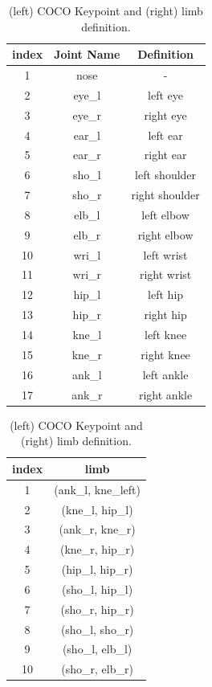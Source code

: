 \begin{table}[htpb]
	\caption[COCO keypoints and limb definition]{(left) COCO Keypoint and (right) limb definition.}\label{ch5:coco-definition}
	\centering
	\begin{tabular}{|c|c|c|}
		\toprule
		index & Joint Name & Definition\\
		\midrule
		1 & nose & - \\ \hline
		2 & eye\_l & left eye \\ \hline
		3 & eye\_r & right eye \\ \hline
		4 & ear\_l & left ear \\ \hline
		5 & ear\_r & right ear \\ \hline
		6 & sho\_l & left shoulder \\ \hline
		7 & sho\_r & right shoulder \\ \hline
		8 & elb\_l & left elbow \\ \hline
		9 & elb\_r & right elbow \\ \hline
		10 & wri\_l & left wrist \\ \hline
		11	 & wri\_r & right wrist \\ \hline
		12 & hip\_l & left hip \\ \hline
		13 & hip\_r & right hip \\ \hline
		14 & kne\_l & left knee \\ \hline
		15 & kne\_r & right knee \\ \hline
		16 & ank\_l & left ankle \\ \hline
		17 & ank\_r & right ankle \\
		\bottomrule
	\end{tabular}
	\hfill
	\begin{tabular}{|c|c| }
		\toprule
		index & limb\\
		\midrule
		1 & (ank\_l, kne\_left) \\ \hline
		2 & (kne\_l, hip\_l) \\ \hline
		3 & (ank\_r, kne\_r) \\ \hline
		4 & (kne\_r, hip\_r)  \\ \hline
		5 & (hip\_l, hip\_r) \\ \hline
		6 & (sho\_l, hip\_l) \\ \hline
		7 & (sho\_r, hip\_r)  \\ \hline
		8 & (sho\_l, sho\_r)  \\ \hline
		9 & (sho\_l, elb\_l)  \\ \hline
		10 & (sho\_r, elb\_r)  \\ \hline

\end{tabular}
\end{table}
